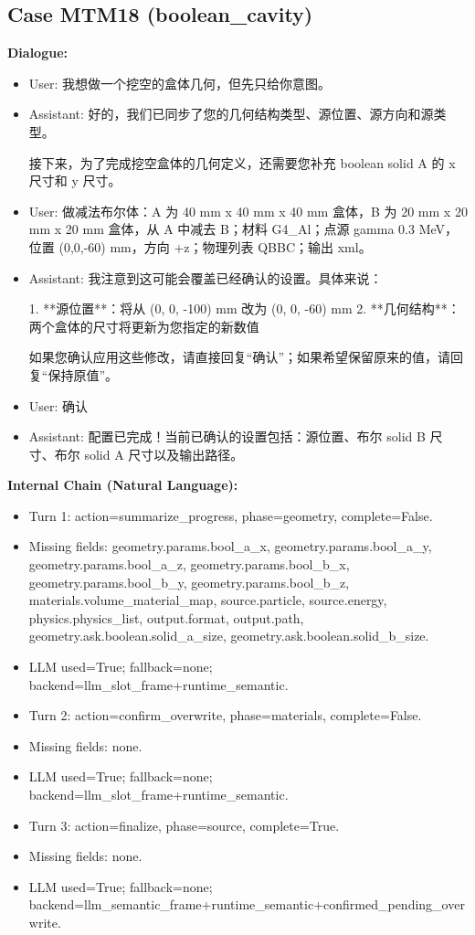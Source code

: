 \documentclass[11pt]{ctexart}
\begin{document}
\subsection{Case MTM18 (boolean\_cavity)}
\textbf{Dialogue:}
\begin{itemize}
\item User: 我想做一个挖空的盒体几何，但先只给你意图。
\item Assistant: 好的，我们已同步了您的几何结构类型、源位置、源方向和源类型。

接下来，为了完成挖空盒体的几何定义，还需要您补充 boolean solid A 的 x 尺寸和 y 尺寸。
\item User: 做减法布尔体：A 为 40 mm x 40 mm x 40 mm 盒体，B 为 20 mm x 20 mm x 20 mm 盒体，从 A 中减去 B；材料 G4\_Al；点源 gamma 0.3 MeV，位置 (0,0,-60) mm，方向 +z；物理列表 QBBC；输出 xml。
\item Assistant: 我注意到这可能会覆盖已经确认的设置。具体来说：

1. **源位置**：将从 (0, 0, -100) mm 改为 (0, 0, -60) mm
2. **几何结构**：两个盒体的尺寸将更新为您指定的新数值

如果您确认应用这些修改，请直接回复“确认”；如果希望保留原来的值，请回复“保持原值”。
\item User: 确认
\item Assistant: 配置已完成！当前已确认的设置包括：源位置、布尔 solid B 尺寸、布尔 solid A 尺寸以及输出路径。
\end{itemize}
\textbf{Internal Chain (Natural Language):}
\begin{itemize}
\item Turn 1: action=summarize\_progress, phase=geometry, complete=False.
\item Missing fields: geometry.params.bool\_a\_x, geometry.params.bool\_a\_y, geometry.params.bool\_a\_z, geometry.params.bool\_b\_x, geometry.params.bool\_b\_y, geometry.params.bool\_b\_z, materials.volume\_material\_map, source.particle, source.energy, physics.physics\_list, output.format, output.path, geometry.ask.boolean.solid\_a\_size, geometry.ask.boolean.solid\_b\_size.
\item LLM used=True; fallback=none; backend=llm\_slot\_frame+runtime\_semantic.
\item Turn 2: action=confirm\_overwrite, phase=materials, complete=False.
\item Missing fields: none.
\item LLM used=True; fallback=none; backend=llm\_slot\_frame+runtime\_semantic.
\item Turn 3: action=finalize, phase=source, complete=True.
\item Missing fields: none.
\item LLM used=True; fallback=none; backend=llm\_semantic\_frame+runtime\_semantic+confirmed\_pending\_overwrite.
\end{itemize}
\end{document}
